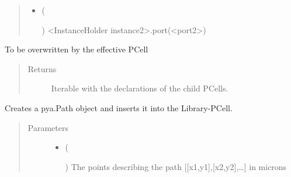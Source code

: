 \documentclass[a4paper,10pt,english]{sphinxmanual}
\begin{document}
\begin{fulllineitems}
\begin{fulllineitems}
\begin{quote}
\begin{description}
\begin{itemize}
\item {} 
 (%
\begin{footnote}[45]\sphinxAtStartFootnote
{}
%
\end{footnote}) \textendash{} \textless{}InstanceHolder instance2\textgreater{}.port(\textless{}port2\textgreater{})

\end{itemize}

\end{description}\end{quote}

\end{fulllineitems}


\begin{fulllineitems}
\label{\detokenize{photonics:photonics.PhotDevice.create_param_inst}}
To be overwritten by the effective PCell
\begin{quote}\begin{description}
\item[{Returns}] \leavevmode
Iterable with the declarations of the child PCells.

\end{description}\end{quote}

\end{fulllineitems}


\begin{fulllineitems}
\label{\detokenize{photonics:photonics.PhotDevice.create_path}}
Creates a pya.Path object and inserts it into the Library-PCell.
\begin{quote}\begin{description}
\item[{Parameters}] \leavevmode\begin{itemize}
\item {} 
 (%
\begin{footnote}[46]\sphinxAtStartFootnote
{}
%
\end{footnote}) \textendash{} The points describing the path {[}{[}x1,y1{]},{[}x2,y2{]},…{]} in microns


\end{itemize}
\end{description}
\end{quote}
\end{fulllineitems}
\end{fulllineitems}
\end{document}
